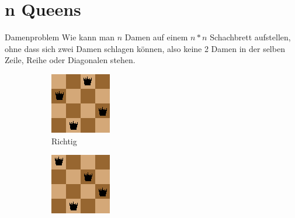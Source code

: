 \documentclass[aspectratio=43,t]{beamer}
\begin{document}
  \section{n Queens}
    \begin{frame}{Damenproblem}
      Wie kann man $n$ Damen auf einem $n * n$ Schachbrett aufstellen, ohne dass sich zwei Damen schlagen können, 
      also keine 2 Damen in der selben Zeile, Reihe oder Diagonalen stehen.
      \begin{figure}[h!]
        \centering
        \begin{subfigure}{0.4\linewidth}
          \includegraphics[width=\linewidth]{../img/queensRight.png}
          \caption{Richtig}
        \end{subfigure}
        \begin{subfigure}{0.4\linewidth}
          \includegraphics[width=\linewidth]{../img/queensWrong.png}

\end{subfigure}
\end{figure}
\end{frame}
\end{document}

